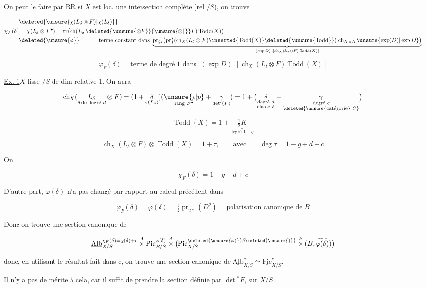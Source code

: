 
On peut le faire par RR si $X$ est loc. une intersection complète (rel $/S$), on trouve

\[
\begin{aligned} &\deleted{\unsure{\chi(L_\delta\otimes F)|\chi(L_\delta)}}\\ \chi_F(\delta)&=\chi(L_\delta\otimes F^{\bullet})=\operatorname{tr}\bigl(\operatorname{ch}(L_\delta\,\deleted{\unsure{\otimes F}}{\unsure{\otimes|\,}}F)\operatorname{Todd}(X)\bigr)\\ &\deleted{\unsure{\varphi}}\qquad=\text{terme constant dans }\underbrace{\operatorname{pr}_{2*}\bigl(\operatorname{pr}_1^{*}(\operatorname{ch}_X(L_\delta\otimes F)\inserted{\operatorname{Todd}(X)}\deleted{\unsure{\operatorname{Todd}}})\,\operatorname{ch}_{X\times B}\unsure{\exp(D)|\exp D}\bigr)}_{(\exp D)\,.[\operatorname{ch}_X(L_\delta\otimes F)\operatorname{Todd}(X)]}\end{aligned}
\]

\[
\varphi_F(\delta)=\text{terme de degré 1 dans }\;(\exp D)\,.[\operatorname{ch}_X(L_\delta\otimes F)\operatorname{Todd}(X)]
\]

\uline{Ex. 1}\qquad $X$ lisse $/S$ de dim relative 1. On aura

\[
\operatorname{ch}_X(\underset{\delta\,\text{de degré }d}{L_\delta}\otimes F)=(1+\underset{c(L_\delta)}{\delta})(\underset{\text{rang } F^{\bullet}}{\unsure{\rho|p}}+\underset{\det^{\prime}(F)}{\gamma})=1+\bigl(\underset{\substack{\text{degré }d\\\text{classe }\delta}}{\delta}+\underset{\substack{\text{degré }c\\\deleted{\text{\unsure{catégorie} }C}}}{\gamma}\bigr)
\]

\[
\operatorname{Todd}(X)=1+\underset{\text{degré }1-g}{\underline{\tfrac12 K}}
\]

\[
\operatorname{ch}_X(L_\delta\otimes F)\otimes\operatorname{Todd}(X)=1+\tau,\qquad\text{avec}\qquad\deg\tau=1-g+d+c
\]

On  

\[
\boxed{\chi_F(\delta)=1-g+d+c}
\]

D'autre part, $\varphi(\delta)$ n'a pas changé  par rapport au calcul précédent dans 

\[
\boxed{\varphi_F(\delta)=\varphi(\delta)=\tfrac12\operatorname{pr}_{2*}(D^2)=\text{polarisation canonique de }B}
\]

Donc on trouve une section canonique de

\[
\underline{\mathrm{Alb}}_{X/S}^{\chi_F(\delta)=\chi(\delta)+c}\overset{A}{\times}\mathrm{Pic}_{B/S}^{\varphi(\delta)}\overset{A}{\times}\bigl(\mathrm{Pic}_{X/S}^{\deleted{\unsure{\varphi(}}\delta\deleted{\unsure{)}}}\overset{B}{\times}(B,\widetilde{\varphi(\delta)})\bigr)
\]

donc, en utilisant le résultat fait dans c, on trouve une section canonique de $\underline{\mathrm{Alb}}^{c}_{X/S}\simeq\underline{\mathrm{Pic}}^{c}_{X/S}$.

Il n'y a pas de mérite à cela, car il suffit de prendre la section définie par  $\det{}^*F$, sur $X/S$.
